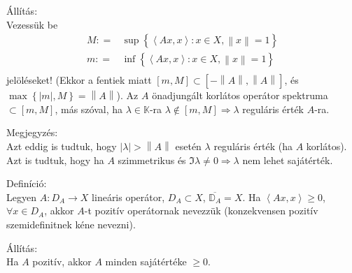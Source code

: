 \documentclass[12pt,a4paper]{scrartcl}
\newenvironment{definicio}{}{}
\newenvironment{allitas}{}{}
\newenvironment{megjegyzes}{}{}
\begin{document}
\begin{allitas}

Állítás:\\
Vezessük be \[\begin{aligned}
  M: =  & \sup \left\{ {\left\langle {Ax,x} \right\rangle :x \in X,\left\| x \right\| = 1} \right\} \\ 
  m: =  & \inf \left\{ {\left\langle {Ax,x} \right\rangle :x \in X,\left\| x \right\| = 1} \right\} \\ 
\end{aligned} \] jelöléseket! (Ekkor a fentiek miatt
\(\left\lbrack {m,M} \right\rbrack \subset \left\lbrack {- \left\| A \right\|,\left\| A \right\|} \right\rbrack\),
és \(\max\left\{ {\left| m \right|,M} \right\} = \left\| A \right\|\)).
Az \(A\) önadjungált korlátos operátor spektruma
\(\subset \left\lbrack {m,M} \right\rbrack\), más szóval, ha
\(\lambda \in {\mathbb{K}}\)-ra
\(\left. \lambda \notin \left\lbrack {m,M} \right\rbrack\Rightarrow\lambda \right.\)
reguláris érték \(A\)-ra.

\end{allitas}

\begin{megjegyzes}

Megjegyzés:\\
Azt eddig is tudtuk, hogy
\(\left| \lambda \right| > \left\| A \right\|\) esetén \(\lambda\)
reguláris érték (ha \(A\) korlátos). Azt is tudtuk, hogy ha \(A\)
szimmetrikus és \(\left. \Im\lambda \neq 0\Rightarrow\lambda \right.\)
nem lehet sajátérték.

\end{megjegyzes}

\begin{definicio}

Definíció:\\
Legyen \(\left. A:D_{A}\rightarrow X \right.\) lineáris operátor,
\(D_{A} \subset X\), \(\overline{{\mathbb{D}}_{A}} = X\). Ha
\(\left\langle {Ax,x} \right\rangle \geq 0\), \(\forall x \in D_{A}\),
akkor \(A\)-t pozitív operátornak nevezzük (konzekvensen pozitív
szemidefinitnek kéne nevezni).

\end{definicio}

\begin{allitas}

Állítás:\\
Ha \(A\) pozitív, akkor \(A\) minden sajátértéke \(\geq 0\).

\end{allitas}
\end{document}
